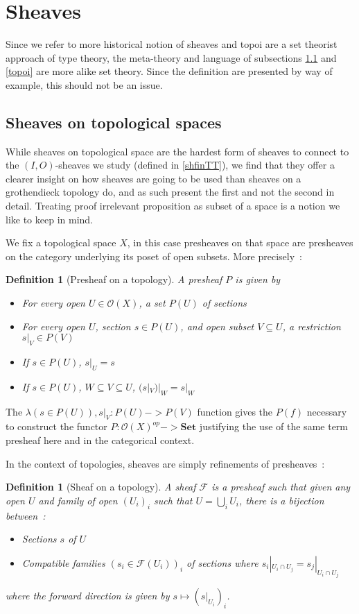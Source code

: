 \documentclass[11pt]{article}
\newtheorem{definition}[theorem]{Definition}
\newcommand{\0}{\mathbf{0}}
\newcommand{\1}{\mathbf{1}}
\begin{document}
\section{Sheaves}\label{Sheaves}

Since we refer to more historical notion of sheaves and topoi are a set theorist approach of type theory, the meta-theory and language of subsections \ref{topsheaves} and \ref{topoi} are more alike set theory.
Since the definition are presented by way of example, this should not be an issue.

\subsection{Sheaves on topological spaces}\label{topsheaves}

While sheaves on topological space are the hardest form of sheaves to connect to the $(I,O)$-sheaves we study (defined in \ref{shfinTT}), we find that they offer a clearer insight on how sheaves are going to be used than sheaves on a grothendieck topology do, and as such present the first and not the second in detail.
Treating proof irrelevant proposition as subset of a space is a notion we like to keep in mind.

We fix a topological space $X$, in this case presheaves on that space are presheaves on the category underlying its poset of open subsets. More precisely~:

\begin{definition}[Presheaf on a topology]
    A \emph{presheaf} $P$ is given by
    \begin{itemize}
        \item For every open $U \in \mathcal{O}(X)$, a set $P(U)$ of \emph{sections}
        \item For every open $U$, section $s\in P(U)$, and open subset $V\subseteq U$, a \emph{restriction} $s|_V\in P(V)$
        \item If $s\in P(U)$, $s|_U = s$
        \item If $s\in P(U)$, $W\subseteq V \subseteq U$, $(s|_V)|_W = s|_W$
    \end{itemize}
\end{definition}
The $\lambda (s\in P(U)), s|_V : P(U) -> P(V)$ function gives the $P(f)$ necessary to construct the functor $P : \mathcal{O}(X)^{op} -> \mathbf{Set}$ justifying the use of the same term presheaf here and in the categorical context.

In the context of topologies, sheaves are simply refinements of presheaves~:
\begin{definition}[Sheaf on a topology]
    A \emph{sheaf} $\mathcal{F}$ is a presheaf such that given any open  $U$ and family of open $(U_i)_i$ such that $U = \bigcup_i U_i$, there is a bijection between~:
    \begin{itemize}
        \item Sections $s$ of $U$
        \item \emph{Compatible} families $(s_i\in \mathcal{F}(U_i))_i$ of sections where $s_i|_{U_i\cap U_j} = s_j|_{U_i\cap U_j}$
    \end{itemize}
    where the forward direction is given by $s \mapsto (s|_{U_i})_i$.
\end{definition}
\end{document}
